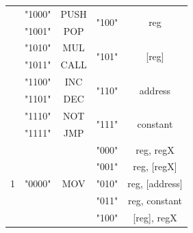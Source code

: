 \documentclass[12pt]{article}
\begin{document}
\begin{table}[!htbp]
\begin{tabular}{|c|c|c|c|c}
                    & "1000"                  & PUSH                 & \multirow{2}{*}{"100"} & \multicolumn{1}{c|}{\multirow{2}{*}{reg}}               \\ \cline{2-3}
                    & "1001"                  & POP                  &                        & \multicolumn{1}{c|}{}                                   \\ \cline{2-5} 
                    & "1010"                  & MUL                  & \multirow{2}{*}{"101"} & \multicolumn{1}{c|}{\multirow{2}{*}{{[}reg{]}}}         \\ \cline{2-3}
                    & "1011"                  & CALL                 &                        & \multicolumn{1}{c|}{}                                   \\ \cline{2-5} 
                    & "1100"                  & INC                  & \multirow{2}{*}{"110"} & \multicolumn{1}{c|}{\multirow{2}{*}{address}}           \\ \cline{2-3}
                    & "1101"                  & DEC                  &                        & \multicolumn{1}{c|}{}                                   \\ \cline{2-5} 
                    & "1110"                  & NOT                  & \multirow{2}{*}{"111"} & \multicolumn{1}{c|}{\multirow{2}{*}{constant}}          \\ \cline{2-3}
                    & "1111"                  & JMP                  &                        & \multicolumn{1}{c|}{}                                   \\ \hline
\multirow{23}{*}{1} & \multirow{7}{*}{"0000"} & \multirow{7}{*}{MOV} & "000"                  & \multicolumn{1}{c|}{reg, regX}                          \\ \cline{4-5} 
                    &                         &                      & "001"                  & \multicolumn{1}{c|}{reg, {[}regX{]}}                    \\ \cline{4-5} 
                    &                         &                      & "010"                  & \multicolumn{1}{c|}{reg, {[}address{]}}                 \\ \cline{4-5} 
                    &                         &                      & "011"                  & \multicolumn{1}{c|}{reg, constant}                      \\ \cline{4-5} 
                    &                         &                      & "100"                  & \multicolumn{1}{c|}{{[}reg{]}, regX}                    \\ \cline{4-5} 

\end{tabular}
\end{table}
\end{document}
